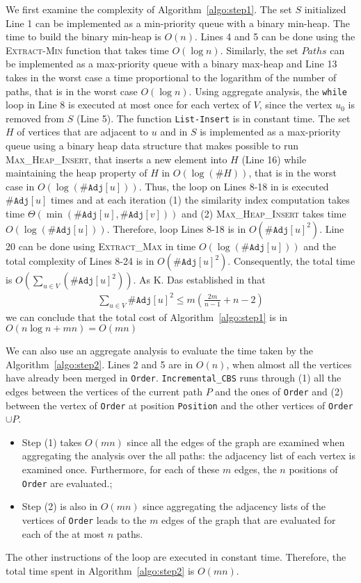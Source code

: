 \documentclass{scrartcl}
\theoremstyle{plain}
\begin{document}
We first examine the complexity of Algorithm~\ref{algo:step1}. The set $S$ 
initialized Line 1 can be implemented as a min-priority queue with a binary 
min-heap. The time to build the binary min-heap is $O(n)$. Lines 4 and 5 can be 
done using the \textsc{Extract-Min} function that takes time $O(\log n)$. 
Similarly, the set $Paths$ can be implemented as a max-priority queue with a 
binary max-heap and Line 13 takes in the worst case a time proportional to the 
logarithm of the number of paths, that is in the worst case $O(\log n)$. Using 
aggregate analysis, the \texttt{while} loop in Line 8 is executed at most once 
for each vertex of $V$, since the vertex $u_0$ is removed from $S$ (Line 5). The 
function \texttt{List-Insert} is in constant time. The set $H$ of vertices that 
are adjacent to $u$ and in $S$ is implemented as a max-priority queue using a 
binary heap data structure that makes possible to run 
\textsc{Max\_Heap\_Insert}, that inserts a new element into $H$ (Line 16) while 
maintaining the heap property of $H$ in $O(\log (\#H))$, that is in the worst 
case in $O(\log (\#\texttt{Adj}[u]))$. Thus, the loop on Lines 8-18 in is 
executed $\#\texttt{Adj}[u]$ times and at each iteration (1) the similarity 
index computation takes time $\Theta(\min(\#\texttt{Adj}[u],\#\texttt{Adj}[v]))$ 
and (2) \textsc{Max\_Heap\_Insert} takes time $O(\log(\#\texttt{Adj}[u]))$. 
Therefore, loop Lines 8-18 is in $O(\#\texttt{Adj}[u]^2)$. Line 20 can be done 
using \textsc{Extract\_Max} in time $O(\log(\#\texttt{Adj}[u]))$ and the total 
complexity of Lines 8-24 is in $O(\#\texttt{Adj}[u]^2)$. Consequently, the total 
time is $O(\sum_{u\in V} (\#\texttt{Adj}[u]^2))$. As K. Das established in 
\cite{Das2003} that 
\begin{align}
	\sum_{u\in V} 
\#\texttt{Adj}[u]^2\leq m\left(\frac{2m}{n-1}+n-2 \right)
\end{align}
we can conclude that the total cost of Algorithm~\ref{algo:step1} is in 
$O(n\log n+mn)=O(mn)$

We can also use an aggregate analysis to evaluate the time taken by the 
Algorithm~\ref{algo:step2}. Lines 2 and 5 are in $O(n)$, when almost all the 
vertices have already been merged in \texttt{Order}. \texttt{Incremental\_CBS} 
runs through (1) all the edges between the vertices of the current path $P$ and 
the ones of \texttt{Order} and (2) between the vertex of \texttt{Order} at 
position \texttt{Position} and the other vertices of \texttt{Order}$\cup P$.
\begin{itemize} 
	\item Step (1) takes $O(mn)$ since all the edges of the graph are examined 
when aggregating the analysis over the all paths: the adjacency list of each 
vertex is examined once. Furthermore, for each of these $m$ edges, the $n$ 
positions of \texttt{Order} are evaluated.;
	\item Step (2) is also in $O(mn)$ since aggregating the adjacency lists of 
the vertices of \texttt{Order} leads to the $m$ edges of the graph that are 
evaluated for each of the at most $n$ paths. \end{itemize}
The other 
instructions of the loop are executed in constant time. Therefore, the total 
time spent in Algorithm~\ref{algo:step2} is $O(mn)$. 
\end{document}
